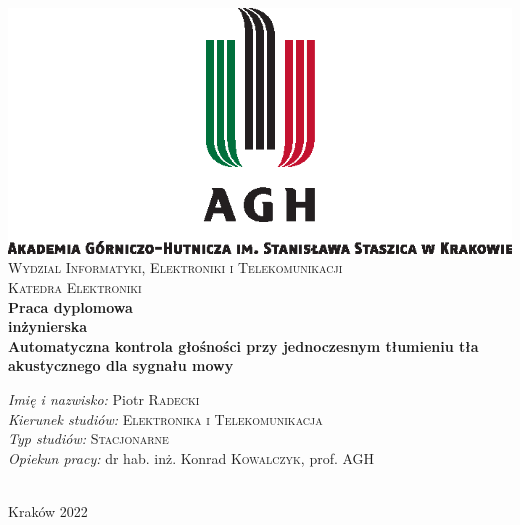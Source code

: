 \begin{titlepage}

\begin{center}

\includegraphics[scale=1.25]{agh_nzw_s_pl_1w_wbr_pms}\\[0.2cm]

\textsc{Wydzial Informatyki, Elektroniki i Telekomunikacji}\\[0.2cm]

\textsc{Katedra Elektroniki}\\[1cm]

\textbf{Praca dyplomowa \\ inżynierska}\\[1cm]

{\huge \bfseries Automatyczna kontrola głośności przy jednoczesnym tłumieniu tła akustycznego dla sygnału mowy}\\[1cm]



\vfill

\begin{minipage}{0.8\textwidth}
\begin{flushleft}
{\large \emph{Imię i nazwisko:} \hfill Piotr \textsc{Radecki}}\\[0.1cm]
{\large \emph{Kierunek studiów:} \hfill \textsc{Elektronika i Telekomunikacja}}\\[0.1cm]
{\large \emph{Typ studiów:} \hfill \textsc{Stacjonarne}}\\[0.1cm]
{\large \emph{Opiekun pracy:} \hfill dr hab. inż. Konrad \textsc{Kowalczyk}, prof. AGH}\\[0.1cm]
\end{flushleft}
\end{minipage}\\[2cm]

Kraków 2022

\end{center}

\end{titlepage}
